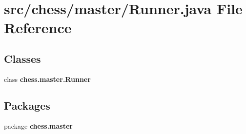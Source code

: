 \section{src/chess/master/\+Runner.java File Reference}
\label{_runner_8java}
\subsection*{Classes}
\begin{DoxyCompactItemize}
\item 
class {\bf chess.\+master.\+Runner}
\end{DoxyCompactItemize}
\subsection*{Packages}
\begin{DoxyCompactItemize}
\item 
package {\bf chess.\+master}
\end{DoxyCompactItemize}
